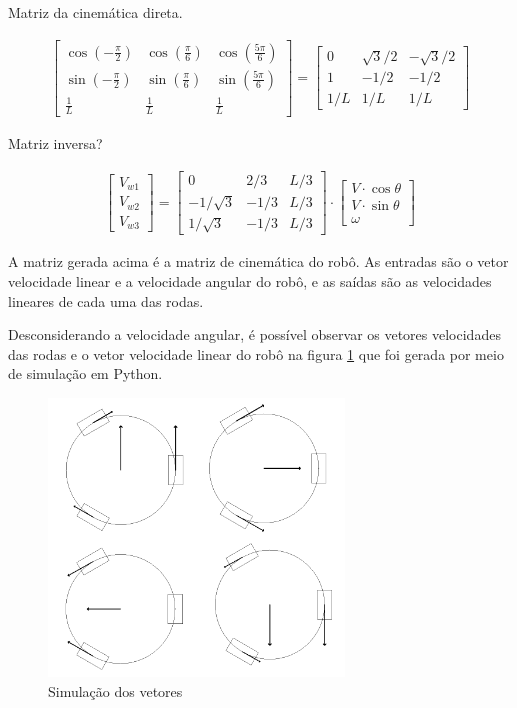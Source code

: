 Matriz da cinemática direta.

\begin{gather}
	\begin{bmatrix}
		\cos{\left(-\frac{\pi}{2}\right)} & \cos{\left(\frac{\pi}{6}\right)} & \cos{\left(\frac{5\pi}{6}\right)} \\
		\sin{\left(-\frac{\pi}{2}\right)} & \sin{\left(\frac{\pi}{6}\right)} & \sin{\left(\frac{5\pi}{6}\right)} \\
		\frac{1}{L} & \frac{1}{L} & \frac{1}{L}
	\end{bmatrix}
	=
	\begin{bmatrix}
		0 & \sqrt{3}/2 & -\sqrt{3}/2 \\
		1 & -1/2 & -1/2  \\
		1/L & 1/L & 1/L
	\end{bmatrix}
\end{gather}



Matriz inversa?


\begin{gather}
	\begin{bmatrix} V_{w1} \\  V_{w2} \\  V_{w3} \end{bmatrix}
	=
	\begin{bmatrix}
		0 & 2/3 & L/3 \\
		-1/\sqrt{3} & -1/3 & L/3\\
		1/\sqrt{3} & -1/3 & L/3
	\end{bmatrix}
	\cdot
	\begin{bmatrix} V\cdot \cos{\theta} \\  V\cdot \sin{\theta} \\  \omega \end{bmatrix}
\end{gather}


A matriz gerada acima é a matriz de cinemática do robô.
As entradas são o vetor velocidade linear e a velocidade angular do robô, e as
saídas são as velocidades lineares de cada uma das rodas.

Desconsiderando a velocidade angular, é possível observar os vetores velocidades
 das rodas e o vetor velocidade linear do robô na figura \ref{simulacao} que foi
 gerada por meio de simulação em Python.

\begin{figure}[h]
	\centering
	\includegraphics[width=0.7\textwidth]{figures/simulacao}
	\caption{Simulação dos vetores}
	\label{simulacao}
\end{figure}